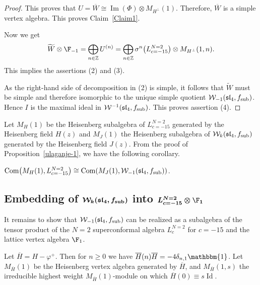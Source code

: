 \begin{proof}
This proves that $ U= \overline W \cong \operatorname{Im} (\Phi) \otimes M_{H^{\perp}} (1) $. Therefore, $\overline W$ is a simple vertex algebra. This proves Claim~\ref{Claim1}.

Now we get
\[
 \widetilde W \otimes \F_{-1} = \bigoplus_{n \in \mathbb{Z}} U^{(n)} = \bigoplus_{n \in \mathbb{Z}} \sigma^n \bigl(L^{N=2}_{c=-15}\bigr) \otimes M_{H^\perp} (1, n).
 \]
This implies the assertions (2) and (3).

As the right-hand side of decomposition in (2) is simple, it follows that $\widetilde W $ must be simple and therefore isomorphic to the unique simple quotient $\mathcal{W}_{-1}(\mathfrak{sl}_4, f_{\rm sub})$. Hence $I$ is the maximal ideal in $\mathcal{W}^{-1}(\mathfrak{sl}_4, f_{\rm sub})$.
This proves assertion (4).
\end{proof}

 Let $M_H(1)$ be the Heisenberg subalgebra of $L^{N=2}_{c=-15}$ generated by the Heisenberg field $H(z)$ and $M_J(1)$ the Heisenberg subalgebra of $\mathcal{W}_{k}(\mathfrak{sl}_4, f_{\rm sub}) $ generated by the Heisenberg field $J(z)$.
From the proof of Proposition~\ref{ulaganje-1}, we have the following corollary.

	\begin{Corollary} \label{pf} $\operatorname{Com} \bigl(M_H(1) , L^{N=2}_{c=-15} \bigr) \cong \operatorname{Com} (M_J(1), \mathcal{W}_{-1}(\mathfrak{sl}_4, f_{\rm sub}) )$. \end{Corollary}
	
\subsection[Embedding of W\_k(sl\_4, f\_sub) into L\^{}N=2\_c=-15]{Embedding of $\boldsymbol{\mathcal{W}_{k}(\mathfrak{sl}_4, f_{\rm sub})}$ into $\boldsymbol{L^{N=2}_{c=-15} \otimes \F_{1}}$ }

It remains to show that $\mathcal{W}_{-1}(\mathfrak{sl}_4, f_{\rm sub}) $ can be realized as a subalgebra of the tensor product of the $N=2$ superconformal algebra $L^{N=2}_{c}$ for $c=-15$ and the lattice vertex algebra $\F_1$.

Let $\overline{H} = H - \varphi^+$. Then for $n \ge 0$ we have $\overline H(n) \overline H = -4 \delta_{n,1}\mathbbm{1}$.
Let $M_{\overline{H}} (1)$ be the Heisenberg vertex algebra generated by $\overline H$, and $M_{\overline{H}} (1, s)$ the irreducible highest weight $M_{\overline{H}} (1)$-module on which
$\overline H(0) \equiv s \operatorname{Id}$.





